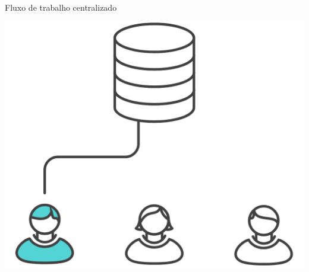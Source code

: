 \documentclass[aspectratio=169]{beamer} %
\begin{document}
\begin{SliTC}{Fluxo de trabalho centralizado}
\begin{itemize}


    \begin{itemize}
    
    
    \end{itemize}

\end{itemize}

\begin{center}
    \includegraphics[scale=.2]{img/git-fluxo-centralizado-conflito4.png}
\end{center}


\end{SliTC}
\end{document}
